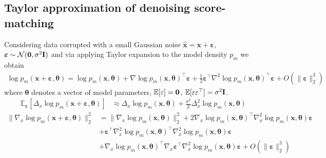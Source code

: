 \subsection{Taylor approximation of denoising score-matching}
\label{sec:Taylor}
    Considering data corrupted with a small Gaussian noise $\hat{\mathbf{x}} = \mathbf{x} + {\bm \varepsilon}$, ${\bm \varepsilon}\sim {\cal N}(\mathbf{0}, \sigma^2 \mathbf{I})$ and via applying Taylor expansion to the model density $p_m$ we obtain
    \begin{align*}
        \log p_m(\mathbf{x} + {\bm \varepsilon}, {\bm \theta}) = \log p_m(\mathbf{x}, {\bm \theta}) + \nabla\log p_m(\mathbf{x}, {\bm \theta})^{\top}{\bm \varepsilon} + \frac{1}{2}{\bm \varepsilon}^{\top}\nabla^2\log p_m(\mathbf{x}, {\bm \theta})^{\top}{\bm \varepsilon} + O(\|{\bm \varepsilon}\|_2^3)
    \end{align*}
    where ${\bm \theta}$ denotes a vector of model parameters, $\mathbb{E}[\varepsilon] = {\bf 0}$, $\mathbb{E}[\varepsilon\varepsilon^{\top}] = \sigma^2 {\bf I}$.
    \begin{align*}
        \mathbb{E}_{{\bm \varepsilon}}[\Delta_x\log p_m(\mathbf{x} + {\bm \varepsilon}, {\bm \theta})]
        &\approx \Delta_x \log p_m(\mathbf{x}, {\bm \theta}) + \frac{\sigma^2}{2}\Delta^2_x \log p_m(\mathbf{x}, {\bm \theta})
    \end{align*}
    \begin{align*}
        \|\nabla_x\log p_m(\mathbf{x} + {\bm \varepsilon}, {\bm \theta})\|_2^2
        &=\|\nabla_x\log p_m(\mathbf{x}, {\bm \theta})\|_2^2
        + 2\nabla_x\log p_m(\mathbf{x}, {\bm \theta})^{\top}\nabla_x^2\log p_m(\mathbf{x}, {\bm \theta}){\bm \varepsilon}\\
        &+ {\bm \varepsilon}^{\top}\nabla_x^2\log p_m(\mathbf{x}, {\bm \theta})^{\top}\nabla_x^2\log p_m(\mathbf{x}, {\bm \theta}){\bm \varepsilon}\\
        &+ \nabla_x\log p_m(\mathbf{x}, {\bm \theta})^{\top}\nabla_x{\bm \varepsilon}^{\top}\nabla_x^2\log p_m(\mathbf{x}, {\bm \theta}){\bm \varepsilon} + O(\|{\bm \varepsilon}\|_2^3)
    \end{align*}
